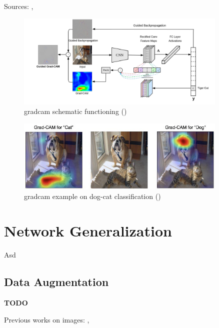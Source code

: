 Sources: \cite{Selvaraju_2019}, \cite{gradcam_medium}

\begin{figure}[!htb]
	\centering
	\includegraphics[width=0.9\textwidth]{"contents/images/gradcam/02-gradcam-schema"}
	\caption[\gls{gradcam} schematic functioning]{\gls{gradcam} schematic functioning (\cite{Selvaraju_2019})}
	\label{fig:gradcam-schema}
\end{figure}

\begin{figure}[!htb]
\centering
\includegraphics[width=0.9\textwidth]{"contents/images/gradcam/02-gradcam-catdog"}
\caption[\gls{gradcam} example on dog-cat classification]{\gls{gradcam} example on dog-cat classification (\cite{Selvaraju_2019})}
\label{fig:gradcam-catdog}
\end{figure}




\section{Network Generalization}
\label{sec:network-generalization}

Asd



\subsection{Data Augmentation}
\label{subsec:data-augmentation}

\textbf{TODO}

Previous works on images: \cite{yue2019domain}, \cite{Takahashi_2020}




